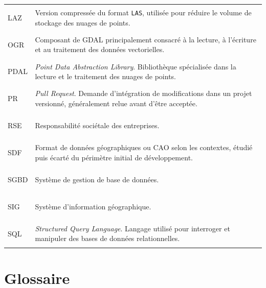 \begin{longtable}{
    @{}
    >{\bfseries\raggedright\arraybackslash}p{}
    >{\raggedright\arraybackslash}p{}
    @{}
}
LAZ
&
Version compressée du format \texttt{LAS}, utilisée pour réduire le volume de
stockage des nuages de points.
\\

OGR
&
Composant de GDAL principalement consacré à la lecture, à l'écriture et au
traitement des données vectorielles.
\\

PDAL
&
\textit{Point Data Abstraction Library}. Bibliothèque spécialisée dans la
lecture et le traitement des nuages de points.
\\

PR
&
\textit{Pull Request}. Demande d'intégration de modifications dans un projet
versionné, généralement relue avant d'être acceptée.
\\

RSE
&
Responsabilité sociétale des entreprises.
\\

SDF
&
Format de données géographiques ou CAO selon les contextes, étudié puis écarté
du périmètre initial de développement.
\\

SGBD
&
Système de gestion de base de données.
\\

SIG
&
Système d'information géographique.
\\

SQL
&
\textit{Structured Query Language}. Langage utilisé pour interroger et
manipuler des bases de données relationnelles.
\\

\end{longtable}

\normalsize

\vspace{0.6cm}


\section*{Glossaire}
{}

\small

